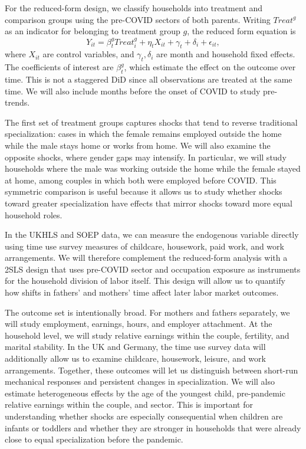 \documentclass[12pt]{article}
\begin{document}
For the reduced-form design, we classify households into treatment and comparison groups using the pre-COVID sectors of both parents. Writing $Treat^g$ as an indicator for belonging to treatment group $g$, the reduced form equation is
\begin{equation} \label{eq:simple_DID}
Y_{it}=\beta^g_{t}Treat^g_i+\eta_t X_{it}+\gamma_t+\delta_i+\epsilon_{it},
\end{equation}
where $X_{it}$ are control variables, and $\gamma_t,\delta_i$ are month and household fixed effects. The coefficients of interest are $\beta_{t}^g$, which estimate the effect on the outcome over time. This is not a staggered DiD since all observations are treated at the same time. We will also include months before the onset of COVID to study pre-trends.

The first set of treatment groups captures shocks that tend to reverse traditional specialization: cases in which the female remains employed outside the home while the male stays home or works from home. We will also examine the opposite shocks, where gender gaps may intensify. In particular, we will study households where the male was working outside the home while the female stayed at home, among couples in which both were employed before COVID. This symmetric comparison is useful because it allows us to study whether shocks toward greater specialization have effects that mirror shocks toward more equal household roles.

In the UKHLS and SOEP data, we can measure the endogenous variable directly using time use survey measures of childcare, housework, paid work, and work arrangements. We will therefore complement the reduced-form analysis with a 2SLS design that uses pre-COVID sector and occupation exposure as instruments for the household division of labor itself. This design will allow us to quantify how shifts in fathers' and mothers' time affect later labor market outcomes.

The outcome set is intentionally broad. For mothers and fathers separately, we will study employment, earnings, hours, and employer attachment. At the household level, we will study relative earnings within the couple, fertility, and marital stability. In the UK and Germany, the time use survey data will additionally allow us to examine childcare, housework, leisure, and work arrangements. Together, these outcomes will let us distinguish between short-run mechanical responses and persistent changes in specialization. We will also estimate heterogeneous effects by the age of the youngest child, pre-pandemic relative earnings within the couple, and sector. This is important for understanding whether shocks are especially consequential when children are infants or toddlers and whether they are stronger in households that were already close to equal specialization before the pandemic.
\end{document}
